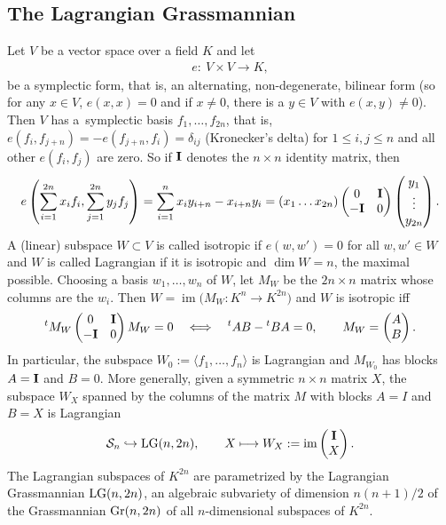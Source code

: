 \documentclass[10pt,a4paper]{amsart}
\newcommand{\cS}{{\cal S}}
\numberwithin{equation}{section}
\providecommand{\cal}{\mathcal}
\begin{document}
\subsection{The Lagrangian Grassmannian} \label{Leg}
Let $V$ be a vector space over a field $K$ and let
\begin{gather*}
e\colon \ V\times V \longrightarrow K,
\end{gather*}
be a symplectic form, that is, an alternating, non-degenerate, bilinear form (so for any $x\in V$, $e(x,x)=0$ and if $x\ne 0$, there is a $y\in V$ with $e(x,y)\ne 0$). Then $V$ has a~symplectic basis $f_1,\ldots,f_{2n}$, that is, $e(f_i,f_{j+n})=-e(f_{j+n},f_i)=\delta_{ij}$ (Kronecker's delta) for $1\leq i,j\leq n$ and all other $e(f_i,f_j)$ are zero. So if ${\bf I}$ denotes the $n\times n$ identity matrix, then
\begin{gather*}
e\left(\sum_{i=1}^{2n} x_if_i,\sum_{j=1}^{2n}y_jf_j\right) = \sum_{i=1}^n x_iy_{i+n} - x_{i+n}y_i = (x_1\ldots x_{2n})
\begin{pmatrix}
 0&{\bf I}\\-{\bf I}&0
 \end{pmatrix}\begin{pmatrix}
 y_1\\ \vdots\\y_{2n}
 \end{pmatrix}.
\end{gather*}
A (linear) subspace $W\subset V$ is called isotropic if $e(w,w')=0$ for all $w,w'\in W$ and $W$ is called Lagrangian if it is isotropic and $\dim W=n$, the maximal possible. Choosing a basis $w_1,\ldots, w_n$ of $W$, let $M_W$ be the $2n\times n$ matrix whose columns are the $w_i$. Then $W=\operatorname{im}\big(M_W\colon K^n\rightarrow K^{2n}\big)$ and $W$ is isotropic iff
\begin{gather*}
{}^tM_W\begin{pmatrix}
 0&{\bf I}\\-{\bf I}&0
 \end{pmatrix} M_W = 0\quad\Longleftrightarrow\quad
 {}^tAB - {}^tBA = 0,\qquad M_W = \begin{pmatrix} A\\B\end{pmatrix}.
\end{gather*}
In particular, the subspace $W_0:=\langle f_1,\ldots,f_n\rangle $ is Lagrangian and $M_{W_0}$ has blocks $A={\bf I}$ and $B=0$. More generally, given a symmetric $n\times n$ matrix $X$, the subspace $W_X$ spanned by the columns of the matrix $M$ with blocks $A=I$ and $B=X$ is Lagrangian
\begin{gather*}
\cS_n \hookrightarrow {\rm LG}(n,2n),\qquad X \longmapsto W_X := \operatorname{im}\begin{pmatrix} {\bf I}\\X\end{pmatrix}.
\end{gather*}
The Lagrangian subspaces of $K^{2n}$ are parametrized by the Lagrangian Grassmannian ${\rm LG}(n,2n)$, an algebraic subvariety of dimension $n(n+1)/2$ of the Grassmannian ${\rm Gr}(n,2n)$ of all $n$-di\-men\-sio\-nal subspaces of $K^{2n}$.
\end{document}
